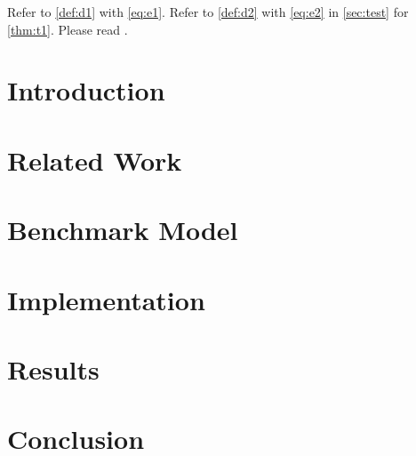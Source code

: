 \documentclass{llncs}
\begin{document}
Refer to \cref{def:d1} with \cref{eq:e1}.
Refer to \cref{def:d2} with \cref{eq:e2} in \cref{sec:test} for \cref{thm:t1}.
Please read \cite{montecarlo}.

\section{Introduction}

\section{Related Work}


\section{Benchmark Model}

\section{Implementation}

\section{Results}

\section{Conclusion}

\printbibliography
\end{document}
